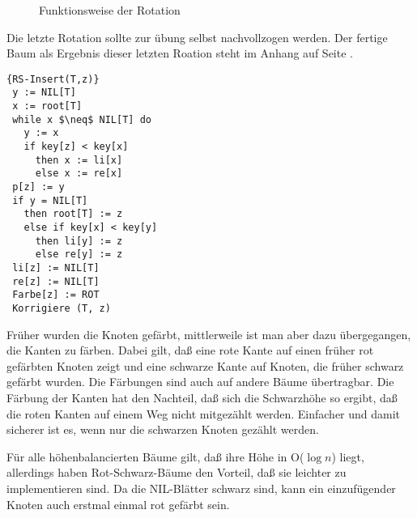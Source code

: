 \begin{figure}[H]
\centering
\hspace{5mm}

\caption{Funktionsweise der Rotation}
\end{figure}
Die letzte Rotation sollte zur übung selbst nachvollzogen werden. Der fertige Baum als Ergebnis dieser letzten Roation steht im Anhang
auf Seite \pageref{rsrotation}.

\begin{Algorithmus}[H]
\begin{lstlisting}[frame=tlrb, mathescape=true, title=\textsc{RS-Insert\textnormal{(T, z)}}, gobble=1]{RS-Insert(T,z)}
 y := NIL[T]
 x := root[T]
 while x $\neq$ NIL[T] do
   y := x
   if key[z] < key[x]
     then x := li[x]
     else x := re[x]
 p[z] := y
 if y = NIL[T]
   then root[T] := z
   else if key[x] < key[y]
     then li[y] := z
     else re[y] := z
 li[z] := NIL[T]
 re[z] := NIL[T]
 Farbe[z] := ROT
 Korrigiere (T, z)
\end{lstlisting}
\end{Algorithmus}

Früher wurden die Knoten gefärbt, mittlerweile ist man aber dazu übergegangen, die Kanten zu färben. Dabei gilt, daß eine rote
Kante auf einen früher rot gefärbten Knoten zeigt und eine schwarze Kante auf Knoten, die früher schwarz gefärbt
wurden. Die Färbungen sind auch auf andere Bäume übertragbar. Die Färbung der Kanten hat den Nachteil, daß sich die Schwarzhöhe so
ergibt, daß die roten Kanten auf einem Weg nicht mitgezählt werden. Einfacher und damit sicherer ist es, wenn nur die schwarzen Knoten
gezählt werden.

Für alle höhenbalancierten Bäume gilt, daß ihre Höhe in O($\log n$) liegt, allerdings haben Rot-Schwarz-Bäume den Vorteil, daß
sie leichter zu implementieren sind. Da die NIL-Blätter schwarz sind, kann ein einzufügender Knoten auch erstmal einmal rot gefärbt
sein.


